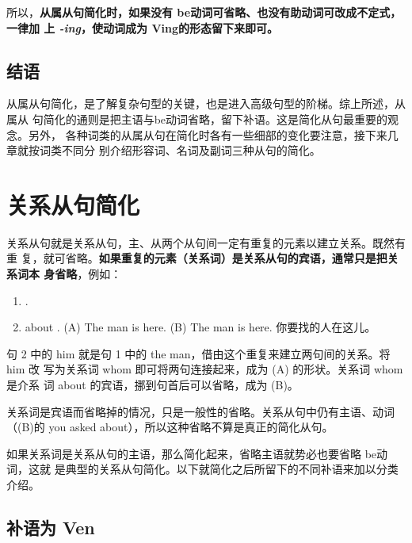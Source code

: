 所以，\textbf{从属从句简化时，如果没有 be动词可省略、也没有助动词可改成不定式，一律加
上 \emph{-ing}，使动词成为 Ving的形态留下来即可。}

\section{结语}

从属从句简化，是了解复杂句型的关键，也是进入高级句型的阶梯。综上所述，从属从
句简化的通则是把主语与be动词省略，留下补语。这是简化从句最重要的观念。另外，
各种词类的从属从句在简化时各有一些细部的变化要注意，接下来几章就按词类不同分
别介绍形容词、名词及副词三种从句的简化。

\chapter{关系从句简化}

关系从句就是关系从句，主、从两个从句间一定有重复的元素以建立关系。既然有重
复，就可省略。\textbf{如果重复的元素（关系词）是关系从句的宾语，通常只是把关系词本
  身省略}，例如：

\begin{enumerate}
\item {}  .
\item {}  about .
\reitem (A) The man  is here.
\reitem (B) The man  is here.
你要找的人在这儿。
\end{enumerate}
句 2 中的 him 就是句 1 中的 the man，借由这个重复来建立两句间的关系。将him 改
写为关系词 whom 即可将两句连接起来，成为 (A) 的形状。关系词 whom是介系
词 about 的宾语，挪到句首后可以省略，成为 (B)。

关系词是宾语而省略掉的情况，只是一般性的省略。关系从句中仍有主语、动词
（(B)的 you asked about），所以这种省略不算是真正的简化从句。

如果关系词是关系从句的主语，那么简化起来，省略主语就势必也要省略 be动词，这就
是典型的关系从句简化。以下就简化之后所留下的不同补语来加以分类介绍。

\section{补语为 Ven}

